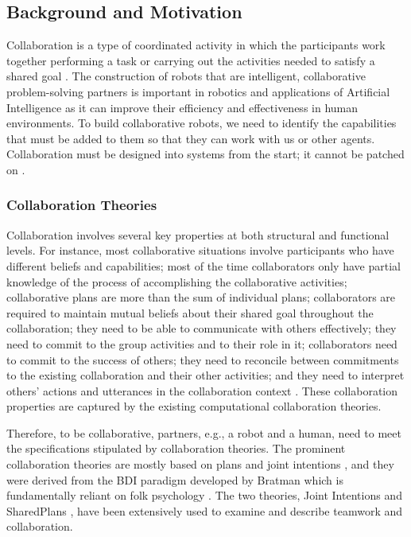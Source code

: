 \documentclass[a4paper, 11pt]{article}
\begin{document}
\begin{small}
\vspace*{-4mm}
\section*{Background and Motivation}
\vspace*{-2mm}
Collaboration is a
type of coordinated activity in which the participants work together performing
a task or carrying out the activities needed to satisfy a shared goal
\cite{grosz:collaboration}. The construction of robots that are intelligent,
collaborative problem-solving partners is important in robotics and applications
of Artificial Intelligence as it can improve their efficiency and effectiveness
in human environments. To build collaborative robots, we need to identify the
capabilities that must be added to them so that they can work with us or other
agents. Collaboration must be designed into systems from the start; it cannot be
patched on \cite{grosz:collaborative-systems}.

\vspace*{-4mm}
\subsubsection*{Collaboration Theories}
Collaboration involves several key properties at both structural and functional
levels. For instance, most collaborative situations involve participants who
have different beliefs and capabilities; most of the time collaborators only
have partial knowledge of the process of accomplishing the collaborative
activities; collaborative plans are more than the sum of individual plans;
collaborators are required to maintain mutual beliefs about their shared goal
throughout the collaboration; they need to be able to communicate with others
effectively; they need to commit to the group activities and to their role in
it; collaborators need to commit to the success of others; they need to
reconcile between commitments to the existing collaboration and their other
activities; and they need to interpret others' actions and utterances in the
collaboration context \cite{grosz:mice-menus}. These collaboration properties
are captured by the existing computational collaboration theories.

Therefore, to be collaborative, partners, e.g., a robot and a human, need
to meet the specifications stipulated by collaboration theories. The prominent
collaboration theories are mostly based on plans and joint intentions
\cite{cohen:teamwork,grosz:plans-discourse,Litman:discourse-commonsense}, and
they were derived from the BDI paradigm developed by Bratman
\cite{bratman:intentions-plans} which is fundamentally reliant on folk
psychology \cite{ravenscroft:folk}. The two theories, Joint Intentions
\cite{cohen:teamwork} and SharedPlans \cite{grosz:plans-discourse}, have been
extensively used to examine and describe teamwork and collaboration. 


\end{small}
\end{document}
